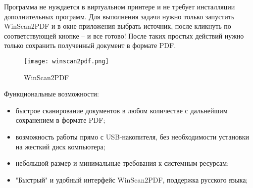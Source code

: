 Программа не нуждается в виртуальном принтере и не требует инсталляции дополнительных программ. Для выполнения задачи нужно только запустить WinScan2PDF и в окне приложения выбрать источник, после кликнуть по соответствующей кнопке – и все готово! После таких простых действий нужно только сохранить полученный документ в формате PDF.

\begin{figure}[h!]
\centering
	\texttt{[image: winscan2pdf.png]}
	\caption{WinScan2PDF}
\end{figure}
\clearpage

Функциональные возможности:
\begin{itemize}
	\item быстрое сканирование документов в любом количестве с дальнейшим сохранением в формате PDF;
	\item возможность работы прямо с USB-накопителя, без необходимости установки на жесткий диск компьютера;
	\item небольшой размер и минимальные требования к системным ресурсам;
	\item "Быстрый" и удобный интерфейс WinScan2PDF, поддержка русского языка;
\end{itemize}